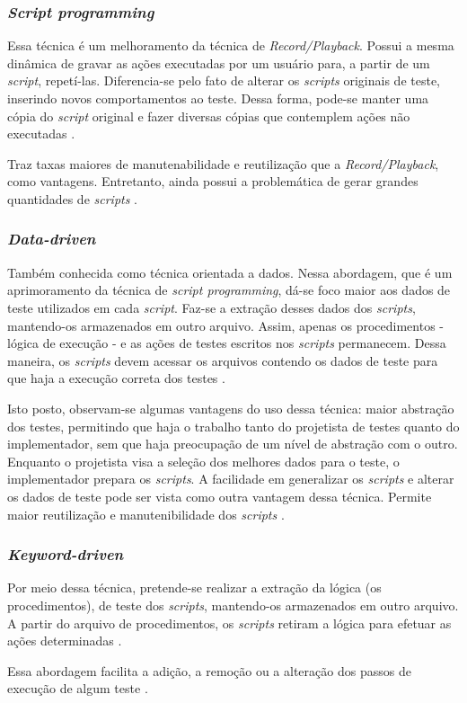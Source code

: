 \subsubsection{\textit{Script programming}}
Essa técnica é um melhoramento da técnica de \textit{Record/Playback}. Possui a
mesma dinâmica de gravar as ações executadas por um usuário para, a partir de
um \textit{script}, repetí-las. Diferencia-se pelo fato de alterar os
\textit{scripts} originais de teste, inserindo novos comportamentos ao teste.
Dessa forma, pode-se manter uma cópia do \textit{script} original e fazer
diversas cópias que contemplem ações não executadas \cite{kent2007}.
\par
\indent Traz taxas maiores de manutenabilidade e reutilização que a
\textit{Record/Playback}, como vantagens. Entretanto, ainda possui a problemática
de gerar grandes quantidades de \textit{scripts} \cite{fantinatoEtAl2004}.
\subsubsection{\textit{Data-driven}}
Também conhecida como técnica orientada a dados. Nessa abordagem, que é um
aprimoramento da técnica de \textit{script programming}, dá-se foco maior aos
dados de teste utilizados em cada \textit{script}. Faz-se a extração desses
dados dos \textit{scripts}, mantendo-os armazenados em outro arquivo. Assim,
apenas os procedimentos - lógica de execução - e as ações de testes escritos nos
\textit{scripts} permanecem. Dessa maneira, os \textit{scripts} devem acessar
os arquivos contendo os dados de teste para que haja a execução correta dos
testes \cite{kent2007}.
\par
\indent Isto posto, observam-se algumas vantagens do uso dessa técnica: maior
abstração dos testes, permitindo que haja o trabalho tanto do projetista de
testes quanto do implementador, sem que haja preocupação de um nível de abstração
com o outro. Enquanto o projetista visa a seleção dos melhores dados para o teste,
 o implementador prepara os \textit{scripts}. A facilidade em generalizar os
 \textit{scripts} e alterar os dados de teste pode ser vista como outra vantagem
 dessa técnica. Permite maior reutilização e manutenibilidade dos \textit{scripts}
 \cite{fantinatoEtAl2004}.
\subsubsection{\textit{Keyword-driven}}
Por meio dessa técnica, pretende-se realizar a extração da lógica
(os procedimentos), de teste dos \textit{scripts}, mantendo-os armazenados em
outro arquivo. A partir do arquivo de procedimentos, os \textit{scripts}
retiram a lógica para efetuar as ações determinadas \cite{kent2007}.
\par
\indent Essa abordagem facilita a adição, a remoção ou a alteração dos passos de
execução de algum teste \cite{fantinatoEtAl2004}.
